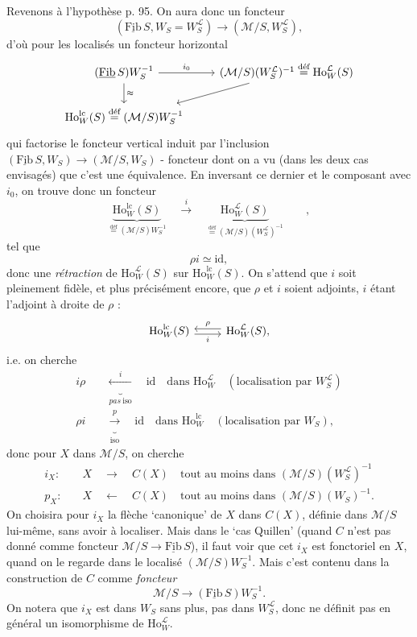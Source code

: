 \documentclass[11pt]{article}
\newcommand{\printedpage}[1]{\marginpar{\footnotesize p.~#1}}
\newcommand{\msp}[1]{\marginpar{\footnotesize [#1]}}
\newcommand{\Ho}{\mathrm{Ho}}
\newcommand{\Fibu}{\underline{\mathrm{Fib}}\,}
\newcommand{\WL}{W_S^{\mathcal{L}}}
\newcommand{\defeq}{\overset{\text{déf}}{=}}
\begin{document}
Revenons à l'hypothèse p. 95. On aura donc un foncteur
\[
(\Fibu S, W_S = \WL) \longrightarrow (\mathcal{M}/S, \WL),
\]
d'où pour les localisés un foncteur horizontal
\[
\begin{tikzcd}
(\Fibu S)W_S^{-1} \arrow[r, "i_0"] \arrow[d, "\approx"] & (\mathcal{M}/S)(\WL)^{-1} \defeq \Ho_W^{\mathcal{L}}(S) \arrow[dl] \\
\Ho_W^{\mathrm{lc}}(S) \defeq (\mathcal{M}/S)W_S^{-1} &
\end{tikzcd}
\]
qui factorise le foncteur vertical induit par l'inclusion $(\Fibu S, W_S) \longrightarrow (\mathcal{M}/S, W_S)$ - foncteur dont on a vu (dans les deux cas envisagés) que c'est une équivalence. En inversant ce dernier et le composant avec $i_0$, on trouve donc un foncteur
\[
\underbrace{\Ho_W^{\mathrm{lc}}(S)}_{\defeq (\mathcal{M}/S)W_S^{-1}} \quad \xrightarrow{\ i\ } \quad \underbrace{\Ho_W^{\mathcal{L}}(S)}_{\defeq (\mathcal{M}/S)(\WL)^{-1}} \qquad ,
\]
tel que
\[
\rho i \simeq \mathrm{id},
\]
donc une \textit{rétraction} de $\Ho_W^{\mathcal{L}}(S)$ sur $\Ho_W^{\mathrm{lc}}(S)$. On s'attend que $i$ soit pleinement fidèle, et plus précisément encore, \msp{page 98} que $\rho$ et $i$ soient adjoints, $i$ étant l'adjoint à droite de $\rho$ :
\[
\begin{tikzcd}
\Ho_W^{\mathrm{lc}}(S) \arrow[r, shift right, "i"'] & \Ho_W^{\mathcal{L}}(S), \arrow[l, shift right, "\rho"']
\end{tikzcd}
\]
\printedpage{62}
i.e. on cherche
\[
\begin{aligned}
i\rho &\quad \underbrace{\xleftarrow{\ i\ }}_{\textit{pas}\ \text{iso}} \quad \mathrm{id} \quad \text{dans } \Ho_W^{\mathcal{L}} \quad (\text{localisation par } \WL)\\
\rho i &\quad \underbrace{\xrightarrow{\ p\ }}_{\text{iso}} \quad \mathrm{id} \quad \text{dans } \Ho_W^{\mathrm{lc}} \quad (\text{localisation par } W_S),
\end{aligned}
\]
 donc pour $X$ dans $\mathcal{M}/S$, on cherche
\[
\begin{aligned}
i_X :&\quad X \quad \longrightarrow \quad C(X) \quad \text{tout au moins dans } (\mathcal{M}/S)(\WL)^{-1}\\
p_X :&\quad X \quad \longleftarrow \quad C(X) \quad \text{tout au moins dans } (\mathcal{M}/S)(W_S)^{-1}.
\end{aligned}
\]
On choisira pour $i_X$ la flèche `canonique' de $X$ dans $C(X)$, définie dans $\mathcal{M}/S$ lui-même, sans avoir à localiser. Mais dans le `cas Quillen' (quand $C$ n'est pas donné comme foncteur $\mathcal{M}/S \longrightarrow \Fibu S$), il faut voir que cet $i_X$ est fonctoriel en $X$, quand on le regarde dans le localisé $(\mathcal{M}/S)W_S^{-1}$. Mais c'est contenu dans la construction de $C$ comme \textit{foncteur}
\[
\mathcal{M}/S \longrightarrow (\Fibu S)W_S^{-1}.
\]
On notera que $i_X$ est dans $W_S$ sans plus, pas dans $\WL$, donc ne définit pas en général un isomorphisme de $\Ho_W^{\mathcal{L}}$.
\end{document}
